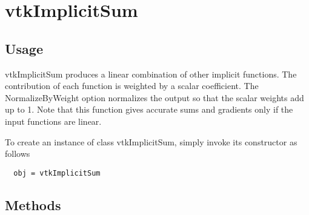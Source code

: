 \section{vtkImplicitSum}

\subsection{Usage}

 vtkImplicitSum produces a linear combination of other implicit functions.
 The contribution of each function is weighted by a scalar coefficient.
 The NormalizeByWeight option normalizes the output so that the
 scalar weights add up to 1. Note that this function gives accurate
 sums and gradients only if the input functions are linear.

To create an instance of class vtkImplicitSum, simply
invoke its constructor as follows
\begin{verbatim}
  obj = vtkImplicitSum
\end{verbatim}
\subsection{Methods}

